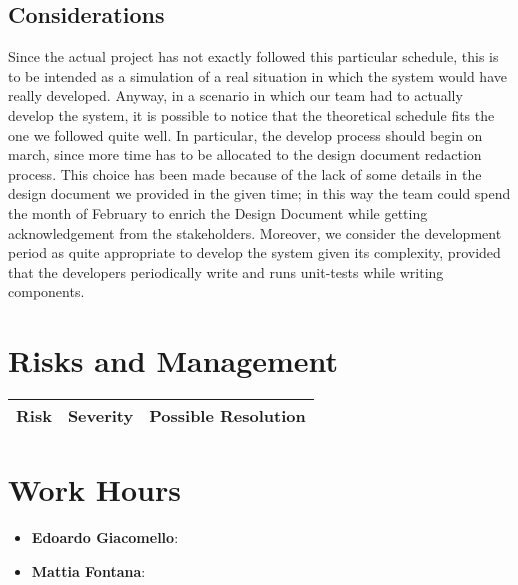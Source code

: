 \documentclass[11pt, a4paper,titlepage]{article}
\begin{document}
	\subsection{Considerations}
	Since the actual project has not exactly followed this particular schedule, this is to be intended as a simulation of a real situation in which the system would have really developed.
	\newline
	Anyway, in a scenario in which our team had to actually develop the system, it is possible to notice that the theoretical schedule fits the one we followed quite well. \newline In particular, the develop process should begin on march, since more time has to be allocated to the design document redaction process.\newline
	This choice has been made because of the lack of some details in the design document we provided in the given time; in this way the team could spend the month of February to enrich the Design Document while getting acknowledgement from the stakeholders. \newline
	Moreover, we consider the development period as quite appropriate to develop the system given its complexity, provided that the developers periodically write and runs unit-tests while writing components.   

	
	\section{Risks and Management}
		\begin{tabularx}{\textwidth}{|X|l|X|}
			\hline
			\textbf{Risk} &	\textbf{Severity} & \textbf{Possible Resolution} \\
			\hline
	\end{tabularx}

	\section{Work Hours}
		\begin{itemize}
			\item \textbf{Edoardo Giacomello}: 
			\item \textbf{Mattia Fontana}: 
		\end{itemize}	
\end{document}

